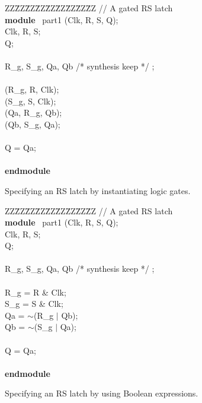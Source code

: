 \documentclass[epsfig,10pt,fullpage]{article}
\begin{document}
\begin{figure}[H]
\begin{center}
\begin{minipage}[t]{12.5 cm}
\begin{tabbing}
ZZ\=ZZ\=ZZ\=ZZ\=ZZ\=ZZ\=ZZ\=ZZ\=ZZ\kill
// A gated RS latch \\
{\bf module} ~part1 (Clk, R, S, Q);\\
 Clk, R, S;\\
 Q;\\
~\\
 R\_g, S\_g, Qa, Qb /* synthesis keep */ ;\\
~\\
 (R\_g, R, Clk);\\
 (S\_g, S, Clk);\\
 (Qa, R\_g, Qb);\\
 (Qb, S\_g, Qa);\\
~\\
 Q = Qa;\\
~\\
{\bf endmodule}\\
\end{tabbing}
\end{minipage}
\end{center}
\caption{Specifying an RS latch by instantiating logic gates.}
\label{fig:latch_code1}
\end{figure}

\begin{figure}[H]
\begin{center}
\begin{minipage}[t]{12.5 cm}
\begin{tabbing}
ZZ\=ZZ\=ZZ\=ZZ\=ZZ\=ZZ\=ZZ\=ZZ\=ZZ\kill
// A gated RS latch\\
{\bf module} ~part1 (Clk, R, S, Q);\\
 Clk, R, S;\\
 Q;\\
~\\
 R\_g, S\_g, Qa, Qb /* synthesis keep */ ;\\
~\\
 R\_g = R \& Clk;\\
 S\_g = S \& Clk;\\
 Qa = $\sim$(R\_g $\mid$ Qb);\\
 Qb = $\sim$(S\_g $\mid$ Qa);\\
~\\
 Q = Qa;\\
~\\
{\bf endmodule}\\
\end{tabbing}
\end{minipage}
\end{center}
\caption{Specifying an RS latch by using Boolean expressions.}
\label{fig:latch_code2}
\end{figure}
\end{document}
